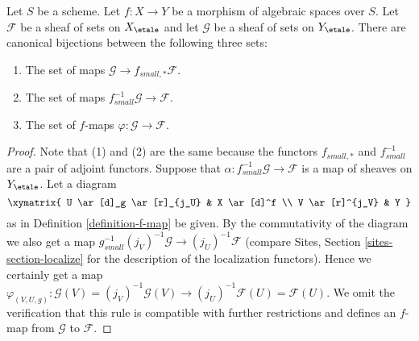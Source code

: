 \begin{lemma}
\label{lemma-f-map}
Let $S$ be a scheme.
Let $f : X \to Y$ be a morphism of algebraic spaces over $S$.
Let $\mathcal{F}$ be a sheaf of sets on $X_\etale$ and
let $\mathcal{G}$ be a sheaf of sets on $Y_\etale$.
There are canonical bijections between the following three sets:
\begin{enumerate}
\item The set of maps $\mathcal{G} \to f_{small, *}\mathcal{F}$.
\item The set of maps $f_{small}^{-1}\mathcal{G} \to \mathcal{F}$.
\item The set of $f$-maps $\varphi : \mathcal{G} \to \mathcal{F}$.
\end{enumerate}
\end{lemma}

\begin{proof}
Note that (1) and (2) are the same because the functors $f_{small, *}$
and $f_{small}^{-1}$ are a pair of adjoint functors.
Suppose that $\alpha : f_{small}^{-1}\mathcal{G} \to \mathcal{F}$
is a map of sheaves on $Y_\etale$. Let a diagram
$$
\xymatrix{
U \ar[d]_g \ar[r]_{j_U} & X \ar[d]^f \\
V \ar[r]^{j_V} & Y
}
$$
as in Definition \ref{definition-f-map} be given.
By the commutativity of the diagram we also get a map
$g_{small}^{-1}(j_V)^{-1}\mathcal{G} \to (j_U)^{-1}\mathcal{F}$
(compare Sites, Section \ref{sites-section-localize} for the
description of the localization functors). Hence we certainly
get a map
$\varphi_{(V, U, g)} :
\mathcal{G}(V) = (j_V)^{-1}\mathcal{G}(V)
\to
(j_U)^{-1}\mathcal{F}(U) = \mathcal{F}(U)$.
We omit the verification that this rule is compatible with
further restrictions and defines an $f$-map from $\mathcal{G}$ to
$\mathcal{F}$.


\end{proof}
